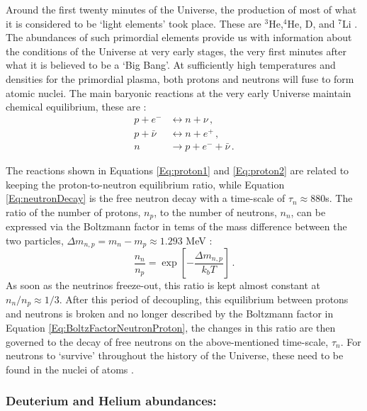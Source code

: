 \qquad Around the first twenty minutes of the Universe, the production of most of what it is considered to be `light elements' took place. These are $^3$He,$^4$He, D, and $^7$Li \citep{2007Steingman-BBN}. The abundances of such primordial elements provide us with information about the conditions of the Universe at very early stages, the very first minutes after what it is believed to be a `Big Bang'. At sufficiently high temperatures and densities for the primordial plasma, both protons and neutrons will fuse to form atomic nuclei. The main baryonic reactions at the very early Universe maintain chemical equilibrium, these are \citep{2016Particle-Review,schneider_2016}:
\begin{align}
    p + e^- & \longleftrightarrow n + \nu \, , \label{Eq:proton1}\\
    p + \bar{\nu} & \longleftrightarrow n + e^+ \, ,\label{Eq:proton2}\\
    n & \rightarrow p + e^- + \bar{\nu}\, . \label{Eq:neutronDecay}
\end{align}

\qquad The reactions shown in Equations \eqref{Eq:proton1} and \eqref{Eq:proton2} are related to keeping the proton-to-neutron equilibrium ratio, while Equation \eqref{Eq:neutronDecay} is the free neutron decay with a time-scale of $\tau_n \approx 880$s. The ratio of the number of protons, $n_p$, to the number of neutrons, $n_n$, can be expressed via the Boltzmann factor in tems of the mass difference between the two particles, $\Delta m_{n,p} = m_n - m_p \approx 1.293$ MeV \citep{2015NeutronProtonRatio}:
\begin{equation}
    \frac{n_n}{n_p} = \exp\left[ - \frac{\Delta m_{n,p}}{k_b T}\right]\, .
    \label{Eq:BoltzFactorNeutronProton}
\end{equation}
As soon as the neutrinos freeze-out, this ratio is kept almost constant at $n_n/n_p \approx 1/3$. After this period of decoupling, this equilibrium between protons and neutrons is broken and no longer described by the Boltzmann factor in Equation \eqref{Eq:BoltzFactorNeutronProton}, the changes in this ratio are then governed to the decay of free neutrons on the above-mentioned time-scale, $\tau_n$. For neutrons to `survive' throughout the history of the Universe, these need to be found in the nuclei of atoms \citep{2007Steingman-BBN}.

\subsubsection{Deuterium and Helium abundances:}

